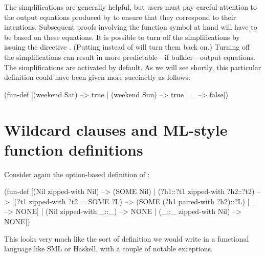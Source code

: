 The simplifications are generally helpful, but users must 
pay careful attention to the output equations produced by 
to ensure that they correspond to their intentions. Subsequent
proofs involving the function symbol at hand will have to be
based on these equations. It is possible to turn off the simplifications
by issuing the directive . 
(Putting  instead of  will turn them back on.)
Turning off the simplifications can result in more predictable---if 
bulkier---output equations. The simplifications are 
activated by default. 
As we will see shortly, this particular definition could have
been given more succinctly as follows:
\begin{tcAthena}
(fun-def [(weekend Sat) --> true
        | (weekend Sun) --> true
        | _ --> false])
\end{tcAthena}


\section{Wildcard clauses and ML-style function definitions}

Consider again the option-based definition of :
\begin{tcAthena}
  (fun-def [(Nil zipped-with Nil) --> (SOME Nil)
          | (?h1::?t1 zipped-with ?h2::?t2) -->
                [(?t1 zipped-with ?t2 = SOME ?L) --> (SOME (?h1 paired-with ?h2)::?L)
               | _ --> NONE]
          | (Nil zipped-with _::_) --> NONE
          | (_::_ zipped-with Nil) --> NONE])
\end{tcAthena}
This looks very much like the sort of definition we would write in a functional
language like SML or Haskell, with a couple of notable exceptions. 

